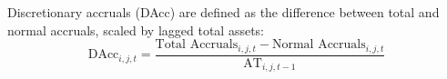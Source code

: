 \documentclass[notitlepage, 12pt]{article}
\begin{document}
\noindent Discretionary accruals (DAcc) are defined as the difference between total and normal accruals, scaled by lagged total assets:
\[\text{DAcc}_{i,j,t} = \dfrac{\text{Total Accruals}_{i,j,t} - \text{Normal Accruals}_{i,j,t}}{\text{AT}_{i,j,t-1}}\]
%
\begin{comment}
\noindent Table \ref{table:descriptivesrd}, Panel A presents descriptive statistics for the full abnormal R\&D sample. Roughly 9\% of the observations are suspect firm years. Column 1 in Table \ref{table:csrrd} presents the results of estimating Eq. \eqref{eq:csr} with abnormal R\&D as the dependent variable and shows that $\gamma_{1}$ is negative and significant at the 1\% level, consistent with suspect firm-years exhibiting unusually low R\&D expense \citep{roychowdhury:2006}. The value of the coefficient is smaller by an order of magnitude compared to that from using abnormal production as the dependent variable, consistent with \citet{gunny:2010}. Column 2 in Table \ref{table:csrrd} shows that the relationship between cutting R\&D expense and meeting earnings benchmarks holds within firms.
\newline

\noindent \citet{valta:2012} notes that the U.S. import data of \citet{schott:2010} only exist for manufacturing industries. Before presenting the results from estimating Eq. \eqref{eq:ddd}, I provide descriptive statistics and re-estimate Eq. \eqref{eq:csr} using the trade subsample. Table \ref{table:descriptivesprod}, Panel B shows that the trade subsample is similar to the full sample. In addition, columns 1 and 2 of Table \ref{table:csrprodpostred} show that the corresponding results from Table \ref{table:csrprod} remain unchanged qualitatively.
\newline

\noindent Column 3 of Table \ref{table:csrprodpostred} shows my main result. $\widehat{\gamma}_{3}$, the coefficient on $\text{Bench}_{i,j,t}\times\text{Post-reduction}_{j,t}$, is negative and significant at the 5\% level, suggesting that on average, treated firms reduce overproduction relative to control firms. The magnitude of $\widehat{\gamma}_{3}$ indicates the possibility that the reduction is so large that there is no evidence that managers engage in overproduction to meet or beat earnings benchmarks in the period following the competitive shock. An $F$-test of $[(\widehat{\gamma}_{1} + \widehat{\gamma}_{3}) = 0]$ confirms this; the $p$-value is 0.5128.
\end{comment}
%
\end{document}
